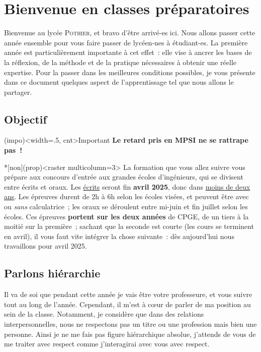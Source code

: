 \documentclass[a4paper, 10pt, final, garamond]{book}
\begin{document}
\chapter*{Bienvenue en classes pr\'eparatoires}

Bienvenue au lycée \textsc{Pothier}, et bravo d'être arrivé-es ici. Nous allons
passer cette année ensemble pour vous faire passer de lycéen-nes à étudiant-es.
La première année est particulièrement importante à cet effet~: elle vise à
ancrer les bases de la réflexion, de la méthode et de la pratique nécessaires à
obtenir une réelle expertise. Pour la passer dans les meilleures conditions
possibles, je vous présente dans ce document quelques aspect de l'apprentissage
tel que nous allons le partager.

\section{Objectif}

\begin{tcbraster}[raster columns=4, raster equal height=rows]
	\begin{tcb}(impo)<width=.5\linewidth, cnt>{Important}
		\textbf{Le retard pris en MPSI ne se rattrape pas~!}
	\end{tcb}
	\begin{tcb}*[non](prop)<raster multicolumn=3>{}
		La formation que vous allez suivre vous prépare aux concours d'entrée
		aux grandes écoles d'ingénieurs, qui se divisent entre écrits et oraux.
		Les \underline{écrits} seront fin \textbf{avril 2025}, donc dans
		\underline{moins de deux ans}. Les épreuves durent de 2h à 6h selon les
		écoles visées, et peuvent être avec ou \textit{sans} calculatrice~; les
		oraux se déroulent entre mi-juin et fin juillet selon les écoles. Ces
		épreuves \textbf{portent sur les deux années} de CPGE, de un tiers à la
		moitié sur la première~; sachant que la seconde est courte (les cours se
		terminent en avril), il vous faut vite intégrer la chose suivante~: dès
		aujourd'hui nous travaillons pour avril 2025.
	\end{tcb}
\end{tcbraster}

\section{Parlons hiérarchie}

Il va de soi que pendant cette année je vais être votre professeure, et vous
suivre tout au long de l'année. Cependant, il m'est à cœur de parler de ma
position au sein de la classe. Notamment, je considère que dans des relations
interpersonnelles, nous ne respectons pas un titre ou une profession mais bien
une personne. Ainsi je ne me fais pas figure hiérarchique absolue, j'attends de
vous de me traiter avec respect comme j'interagirai avec vous avec respect.
\end{document}
